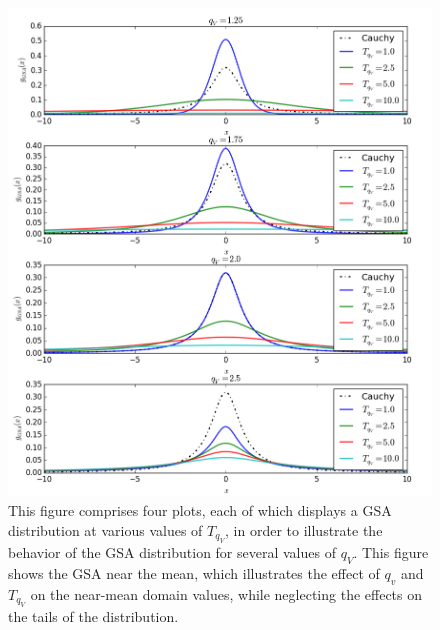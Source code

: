 \documentclass[11pt]{afthesis}
\begin{document}
	\begin{figure}[ht!]
		
		\centerline{\includegraphics[width = 5in]{figures/gsa_distributions.png}}
		\caption{This figure comprises four plots, each of which displays a GSA distribution at various values of $T_{q_V}$, in order to illustrate the behavior of the GSA distribution for several values of $q_V$. This figure shows the GSA near the mean, which illustrates the effect of $q_v$ and $T_{q_V}$ on the near-mean domain values, while neglecting the effects on the tails of the distribution.}
		\label{fig:gsa_distribution}
	\end{figure}	
	
\end{document}
